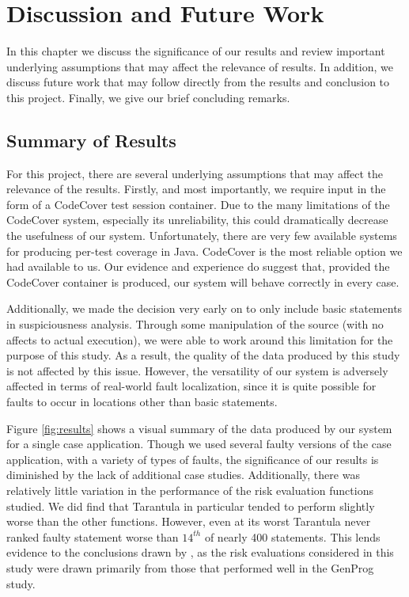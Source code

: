 %
%
%

\chapter{Discussion and Future Work}\label{ch:conclusion}

In this chapter we discuss the significance of our results and review
important underlying assumptions that may affect the relevance of results.
In addition, we discuss future work that may follow directly from the 
results and conclusion to this project.  Finally, we give our brief
concluding remarks.

\section{Summary of Results}\label{sec:summ}

For this project, there are several underlying assumptions that may affect
the relevance of the results.  Firstly, and most importantly, we require
input in the form of a CodeCover test session container.  Due to the many
limitations of the CodeCover system, especially its unreliability, this 
could dramatically decrease the usefulness of our system.  Unfortunately,
there are very few available systems for producing per-test coverage in
Java.  CodeCover is the most reliable option we had available to us.  Our
evidence and experience do suggest that, provided the CodeCover container
is produced, our system will behave correctly in every case.

Additionally, we made the decision very early on to only include basic
statements in suspiciousness analysis.  Through some manipulation of the
source (with no affects to actual execution), we were able to work around
this limitation for the purpose of this study.  As a result, the quality
of the data produced by this study is not affected by this issue.  However,
the versatility of our system is adversely affected in terms of real-world
fault localization, since it is quite possible for faults to occur in
locations other than basic statements.  

Figure \ref{fig:results} shows a visual summary of the data produced by our
system for a single case application.  Though we used several faulty
versions of the case application, with a variety of types of faults, the
significance of our results is diminished by the lack of additional case
studies.  Additionally, there was relatively little variation in the performance
of the risk evaluation functions studied.  We did find that Tarantula in
particular tended to perform slightly worse than the other functions.  However,
even at its worst Tarantula never ranked faulty statement worse than $14^{th}$ of
nearly 400 statements.  This lends evidence to the conclusions drawn by \cite{genprog},
as the risk evaluations considered in this study were drawn primarily from those
that performed well in the GenProg study.

